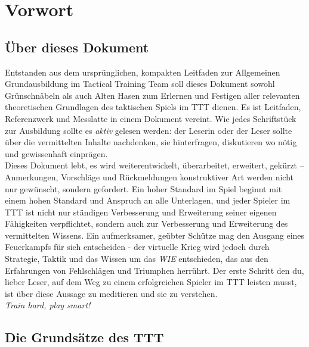 \section{Vorwort}
\subsection{Über dieses Dokument}
Entstanden aus dem ursprünglichen, kompakten Leitfaden zur Allgemeinen Grundausbildung im Tactical Training Team soll dieses Dokument sowohl Grünschnäbeln als auch Alten Hasen zum Erlernen und Festigen aller relevanten theoretischen Grundlagen des taktischen Spiels im TTT dienen. Es ist Leitfaden, Referenzwerk und Messlatte in einem Dokument vereint. Wie jedes Schriftstück zur Ausbildung sollte es \textit{aktiv} gelesen werden: der Leserin oder der Leser sollte über die vermittelten Inhalte nachdenken, sie hinterfragen, diskutieren wo nötig und gewissenhaft einprägen.\\
Dieses Dokument lebt, es wird weiterentwickelt, überarbeitet, erweitert, gekürzt -- Anmerkungen, Vorschläge und Rückmeldungen konstruktiver Art werden nicht nur gewünscht, sondern gefordert. Ein hoher Standard im Spiel beginnt mit einem hohen Standard und Anspruch an alle Unterlagen, und jeder Spieler im TTT ist nicht nur ständigen Verbesserung und Erweiterung seiner eigenen Fähigkeiten verpflichtet, sondern auch zur Verbesserung und Erweiterung des vermittelten Wissens. Ein aufmerksamer, geübter Schütze mag den Ausgang eines Feuerkampfs für sich entscheiden - der virtuelle Krieg wird jedoch durch Strategie, Taktik und das Wissen um das \textit{WIE} entschieden, das aus den Erfahrungen von Fehlschlägen und Triumphen herrührt. Der erste Schritt den du, lieber Leser, auf dem Weg zu einem erfolgreichen Spieler im TTT leisten musst, ist über diese Aussage zu meditieren und sie zu verstehen.\\
\newline
\textit{Train hard, play smart!}

\newpage
\subsection{Die Grundsätze des TTT}

